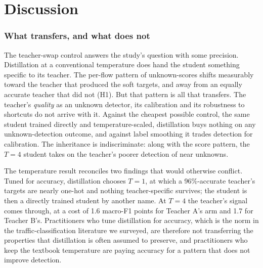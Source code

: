 \documentclass[journal]{IEEEtran}
\begin{document}
\section{Discussion}
\label{sec:discussion}

\subsubsection*{What transfers, and what does not}
The teacher-swap control answers the study's question with some precision. Distillation at a conventional temperature does hand the student something specific to its teacher. The per-flow pattern of unknown-scores shifts measurably toward the teacher that produced the soft targets, and away from an equally accurate teacher that did not (H1). But that pattern is all that transfers. The teacher's \emph{quality} as an unknown detector, its calibration and its robustness to shortcuts do not arrive with it. Against the cheapest possible control, the same student trained directly and temperature-scaled, distillation buys nothing on any unknown-detection outcome, and against label smoothing it trades detection for calibration. The inheritance is indiscriminate: along with the score pattern, the $T=4$ student takes on the teacher's poorer detection of near unknowns.

The temperature result reconciles two findings that would otherwise conflict. Tuned for accuracy, distillation chooses $T=1$, at which a 96\%-accurate teacher's targets are nearly one-hot and nothing teacher-specific survives; the student is then a directly trained student by another name. At $T=4$ the teacher's signal comes through, at a cost of 1.6 macro-F1 points for Teacher A's arm and 1.7 for Teacher B's. Practitioners who tune distillation for accuracy, which is the norm in the traffic-classification literature we surveyed, are therefore not transferring the properties that distillation is often assumed to preserve, and practitioners who keep the textbook temperature are paying accuracy for a pattern that does not improve detection.
\end{document}
